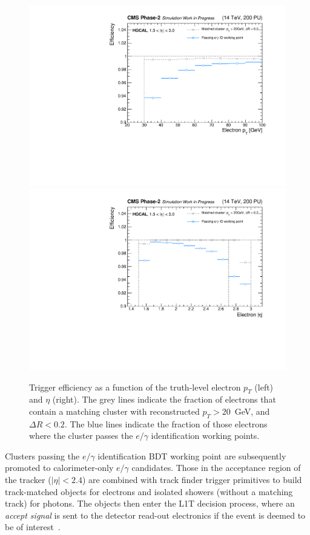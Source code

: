 \begin{figure}
  \centering
  \includegraphics[width=.49\textwidth]{Figures/cms/egid/eff_vs_cl3d_gen_pt.pdf}
  \includegraphics[width=.49\textwidth]{Figures/cms/egid/eff_vs_cl3d_gen_eta.pdf}
  \caption[Efficiency of the $e/\gamma$ identification as a function of electron $p_T$ and $\eta$.]
  {
    Trigger efficiency as a function of the truth-level electron $p_T$ (left) and $\eta$ (right). The grey lines indicate the fraction of electrons that contain a matching cluster with reconstructed $p_T>20$~GeV, and $\Delta R<0.2$. The blue lines indicate the fraction of those electrons where the cluster passes the $e/\gamma$ identification working points.
  }
  \label{fig:egid_efficiency}
\end{figure}

Clusters passing the $e/\gamma$ identification BDT working point are subsequently promoted to calorimeter-only $e/\gamma$ candidates. 
Those in the acceptance region of the tracker (${|\eta|<2.4}$) are combined with track finder trigger primitives to build track-matched objects for electrons and isolated showers (without a matching track) for photons. The objects then enter the L1T decision process, where an \textit{accept signal} is sent to the detector read-out electronics if the event is deemed to be of interest~\cite{CERN-LHCC-2020-004}.

